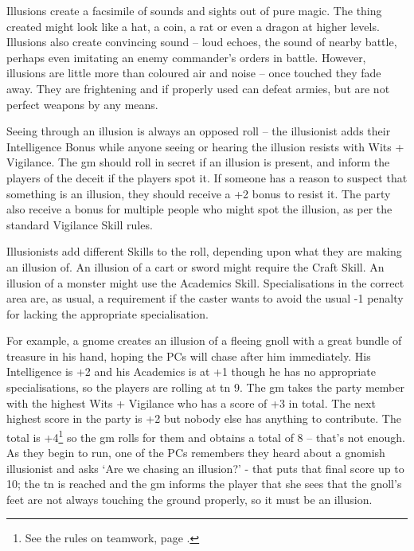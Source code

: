 \documentclass[titlepage,a4paper,openany]{book}
\begin{document}
\begin{multicols}{2}

Illusions create a facsimile of sounds and sights out of pure magic. The thing created might look like a hat, a coin, a rat or even a dragon at higher levels. Illusions also create convincing sound -- loud echoes, the sound of nearby battle, perhaps even imitating an enemy commander's orders in battle. However, illusions are little more than coloured air and noise -- once touched they fade away. They are frightening and if properly used can defeat armies, but are not perfect weapons by any means.

Seeing through an illusion is always an opposed roll -- the illusionist adds their Intelligence Bonus while anyone seeing or hearing the illusion resists with Wits + Vigilance. The \gls{gm} should roll in secret if an illusion is present, and inform the players of the deceit if the players spot it. If someone has a reason to suspect that something is an illusion, they should receive a +2 bonus to resist it. The party also receive a bonus for multiple people who might spot the illusion, as per the standard Vigilance Skill rules.

Illusionists add different Skills to the roll, depending upon what they are making an illusion of. An illusion of a cart or sword might require the Craft Skill. An illusion of a monster might use the Academics Skill. Specialisations in the correct area are, as usual, a requirement if the caster wants to avoid the usual -1 penalty for lacking the appropriate specialisation.

For example, a gnome creates an illusion of a fleeing gnoll with a great bundle of treasure in his hand, hoping the PCs will chase after him immediately. His Intelligence is +2 and his Academics is at +1 though he has no appropriate specialisations, so the players are rolling at \gls{tn} 9. The \gls{gm} takes the party member with the highest Wits + Vigilance who has a score of +3 in total. The next highest score in the party is +2 but nobody else has anything to contribute. The total is +4\footnote{See the rules on teamwork, page \pageref{teamwork}.} so the \gls{gm} rolls for them and obtains a total of 8 -- that's not enough. As they begin to run, one of the PCs remembers they heard about a gnomish illusionist and asks `Are we chasing an illusion?' - that puts that final score up to 10; the \gls{tn} is reached and the \gls{gm} informs the player that she sees that the gnoll's feet are not always touching the ground properly, so it must be an illusion.


\end{multicols}
\end{document}
